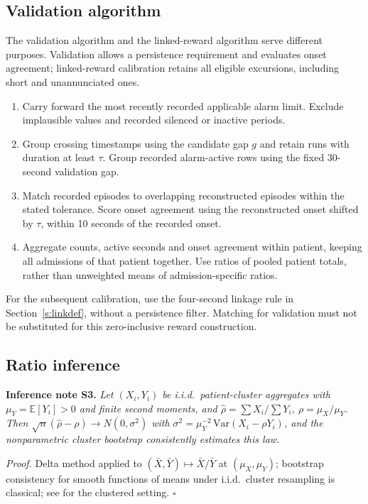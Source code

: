 \documentclass[11pt,letterpaper]{article}
\begin{document}
\subsection{Validation algorithm}\label{s:algorithm}
The validation algorithm and the linked-reward algorithm serve different purposes. Validation allows a persistence requirement and evaluates onset agreement; linked-reward calibration retains all eligible excursions, including short and unannunciated ones.
\begin{enumerate}\itemsep2pt
\item Carry forward the most recently recorded applicable alarm limit. Exclude implausible values and recorded silenced or inactive periods.
\item Group crossing timestamps using the candidate gap $g$ and retain runs with duration at least $\tau$. Group recorded alarm-active rows using the fixed 30-second validation gap.
\item Match recorded episodes to overlapping reconstructed episodes within the stated tolerance. Score onset agreement using the reconstructed onset shifted by $\tau$, within 10 seconds of the recorded onset.
\item Aggregate counts, active seconds and onset agreement within patient, keeping all admissions of that patient together. Use ratios of pooled patient totals, rather than unweighted means of admission-specific ratios.
\end{enumerate}
For the subsequent calibration, use the four-second linkage rule in Section~\ref{s:linkdef}, without a persistence filter. Matching for validation must not be substituted for this zero-inclusive reward construction.


\subsection{Ratio inference}\label{s:ratio}
\textbf{Inference note S3.} \emph{Let $(X_i,Y_i)$ be i.i.d.\ patient-cluster aggregates with
$\mu_Y=\mathbb E[Y_i]>0$ and finite second moments, and $\hat\rho=\sum X_i/\sum Y_i$,
$\rho=\mu_X/\mu_Y$. Then $\sqrt n(\hat\rho-\rho)\rightarrow N(0,\sigma^2)$ with
$\sigma^2=\mu_Y^{-2}\,\mathrm{Var}(X_i-\rho Y_i)$, and the nonparametric cluster bootstrap consistently
estimates this law.}

\emph{Proof.} Delta method applied to $(\bar X,\bar Y)\mapsto\bar X/\bar Y$ at $(\mu_X,\mu_Y)$; bootstrap
consistency for smooth functions of means under i.i.d.\ cluster resampling is classical; see
\citet{field2007bootstrapping} for the clustered setting. $\square$
\end{document}
